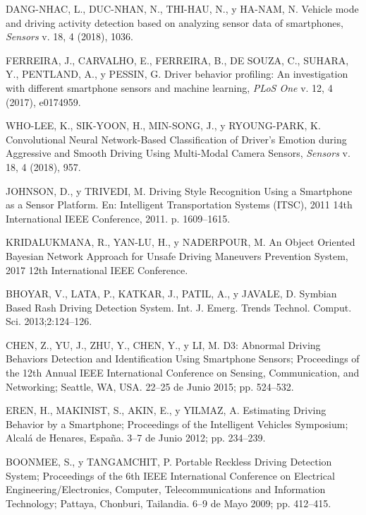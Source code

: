 
\begin{thebibliography}{19}
DANG-NHAC, L., DUC-NHAN, N., THI-HAU, N., y HA-NAM, N. Vehicle mode and driving activity detection based on analyzing sensor data of smartphones, \textit{Sensors} v. 18, 4 (2018), 1036.

FERREIRA, J., CARVALHO, E., FERREIRA, B., DE SOUZA, C., SUHARA, Y., PENTLAND, A., y PESSIN, G. Driver behavior profiling: An investigation with different smartphone sensors and machine learning, \textit{PLoS One} v. 12, 4 (2017), e0174959.

WHO-LEE, K., SIK-YOON, H., MIN-SONG, J., y RYOUNG-PARK, K. Convolutional Neural Network-Based Classification of Driver’s Emotion during Aggressive and Smooth Driving Using Multi-Modal Camera Sensors, \textit{Sensors} v. 18, 4 (2018), 957.

JOHNSON, D., y TRIVEDI, M. Driving Style Recognition Using a Smartphone as a Sensor Platform. En: Intelligent Transportation Systems (ITSC), 2011 14th International IEEE Conference, 2011. p. 1609–1615.

KRIDALUKMANA, R., YAN-LU, H., y NADERPOUR, M. An Object Oriented Bayesian Network Approach for Unsafe Driving Maneuvers Prevention System, 2017 12th International IEEE Conference.

BHOYAR, V., LATA, P., KATKAR, J., PATIL, A., y JAVALE, D. Symbian Based Rash Driving Detection System. Int. J. Emerg. Trends Technol. Comput. Sci. 2013;2:124–126.

CHEN, Z., YU, J., ZHU, Y., CHEN, Y., y LI, M. D3: Abnormal Driving Behaviors Detection and Identification Using Smartphone Sensors; Proceedings of the 12th Annual IEEE International Conference on Sensing, Communication, and Networking; Seattle, WA, USA. 22–25 de Junio 2015; pp. 524–532.

EREN, H., MAKINIST, S., AKIN, E., y YILMAZ, A. Estimating Driving Behavior by a Smartphone; Proceedings of the Intelligent Vehicles Symposium; Alcalá de Henares, Espa\~{n}a. 3–7 de Junio 2012; pp. 234–239.

BOONMEE, S., y TANGAMCHIT, P. Portable Reckless Driving Detection System; Proceedings of the 6th IEEE International Conference on Electrical Engineering/Electronics, Computer, Telecommunications and Information Technology; Pattaya, Chonburi, Tailandia. 6–9 de Mayo 2009; pp. 412–415.


\end{thebibliography}
